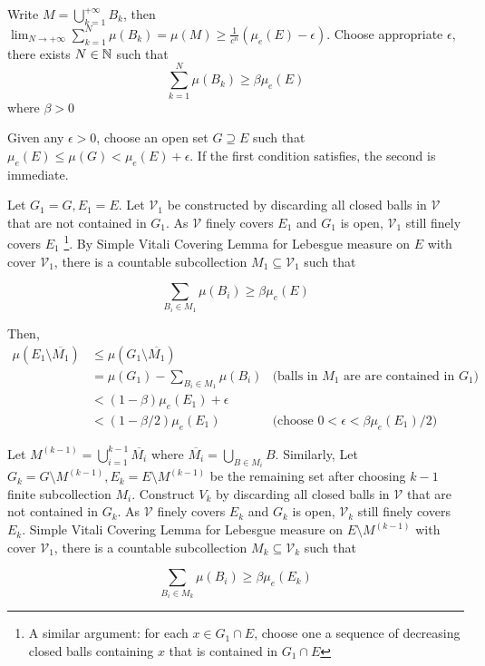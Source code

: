 \documentclass{report}
\begin{document}
Write $M = \bigcup_{k=1}^{+\infty} B_k$, then $\lim_{N \to +\infty} \sum_{k=1}^N \mu(B_k) = \mu(M) \geq \frac{1}{c^n} (\mu_e(E) - \epsilon)$. Choose appropriate $\epsilon$, there exists $N \in \mathbb{N}$ such that 
\[
    \sum_{k=1}^N \mu(B_k) \geq \beta \mu_e(E)
\]
where $\beta > 0$

Given any $\epsilon > 0$, choose an open set $G \supseteq E$ such that $\mu_e(E) \leq \mu(G) < \mu_e(E) + \epsilon$. If the first condition satisfies, the second is immediate.

Let $G_1 = G, E_1 = E$. Let $\mathcal{V}_1$ be constructed by discarding all closed balls in $\mathcal{V}$ that are not contained in $G_1$. As $\mathcal{V}$ finely covers $E_1$ and $G_1$ is open, $\mathcal{V}_1$ still finely covers $E_1$ \footnote{A similar argument: for each $x \in G_1 \cap E$, choose one a sequence of decreasing closed balls containing $x$ that is contained in $G_1 \cap E$}. By Simple Vitali Covering Lemma for Lebesgue measure on $E$ with cover $\mathcal{V}_1$, there is a countable subcollection $M_1 \subseteq \mathcal{V}_1$ such that

\[
    \sum_{B_i \in M_1} \mu(B_i) \geq \beta \mu_e(E)
\]


Then,
\begin{align*}
    \mu\left( E_1 \setminus \overline{M_1} \right)
    &\leq \mu\left( G_1 \setminus \overline{M_1} \right) \\
    &= \mu(G_1) - \sum_{B_i \in M_1} \mu(B_i) &\text{(balls in $M_1$ are are contained in $G_1$)} \\
    &< (1 - \beta) \mu_e(E_1) + \epsilon \\
    &< (1 - \beta/2) \mu_e(E_1) &\text{(choose $0 < \epsilon < \beta \mu_e(E_1) /2$)} 
\end{align*}

Let $M^{(k-1)} = \bigcup_{i=1}^{k-1} \overline{M_i}$ where $\overline{M_i} = \bigcup_{B \in M_i} B$. Similarly, Let $G_k = G \setminus M^{(k-1)}, E_k = E \setminus M^{(k-1)}$  be the remaining set after choosing $k-1$ finite subcollection $M_i$. Construct $V_k$ by discarding all closed balls in $\mathcal{V}$ that are not contained in $G_k$. As $\mathcal{V}$ finely covers $E_k$ and $G_k$ is open, $\mathcal{V}_k$ still finely covers $E_k$. Simple Vitali Covering Lemma for Lebesgue measure on $E \setminus M^{(k-1)}$ with cover $\mathcal{V}_1$, there is a countable subcollection $M_k \subseteq \mathcal{V}_k$ such that

\[
    \sum_{B_i \in M_k} \mu(B_i) \geq \beta \mu_e(E_k)
\]
\end{document}
